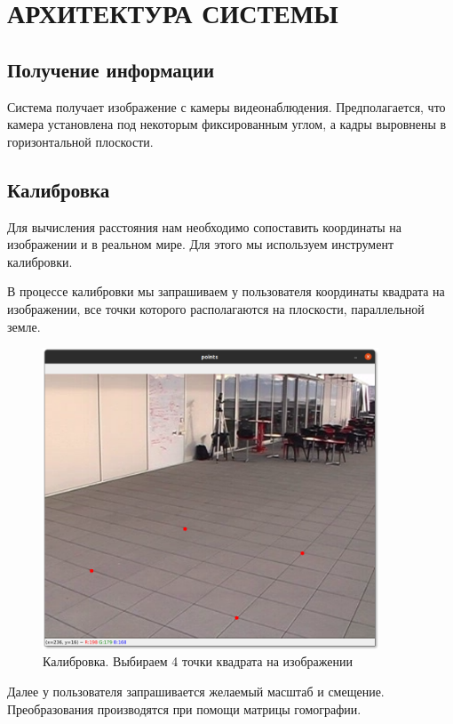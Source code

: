 \chapter{АРХИТЕКТУРА СИСТЕМЫ}


\section{Получение информации}


Система получает изображение с камеры видеонаблюдения. Предполагается, что камера установлена под некоторым фиксированным углом, а кадры выровнены в горизонтальной плоскости. 

\section{Калибровка}

Для вычисления расстояния нам необходимо сопоставить координаты на изображении и в реальном мире. Для этого мы используем инструмент калибровки.


В процессе калибровки мы запрашиваем у пользователя координаты квадрата на изображении, все точки которого располагаются на плоскости, параллельной земле. 


\begin{figure}[H]
    \centering
    \includegraphics[width=10cm]{images/calibration1.png}
    \caption{Калибровка. Выбираем 4 точки квадрата на изображении}
    \label{<label>}
\end{figure}

Далее у пользователя запрашивается желаемый масштаб и смещение. Преобразования производятся при помощи матрицы гомографии.

